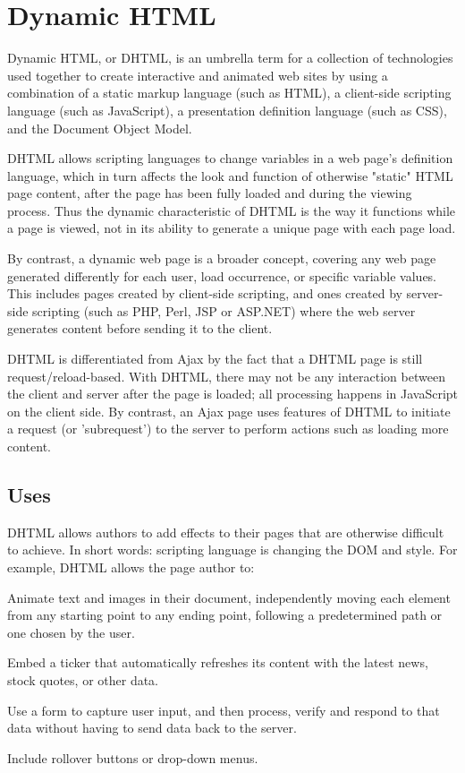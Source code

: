 \part{Dynamic HTML}


Dynamic HTML, or DHTML, is an umbrella term for a collection of technologies used together to create interactive and animated web sites by using a combination of a static markup language (such as HTML), a client-side scripting language (such as JavaScript), a presentation definition language (such as CSS), and the Document Object Model.

DHTML allows scripting languages to change variables in a web page's definition language, which in turn affects the look and function of otherwise "static" HTML page content, after the page has been fully loaded and during the viewing process. Thus the dynamic characteristic of DHTML is the way it functions while a page is viewed, not in its ability to generate a unique page with each page load.

By contrast, a dynamic web page is a broader concept, covering any web page generated differently for each user, load occurrence, or specific variable values. This includes pages created by client-side scripting, and ones created by server-side scripting (such as PHP, Perl, JSP or ASP.NET) where the web server generates content before sending it to the client.

DHTML is differentiated from Ajax by the fact that a DHTML page is still request/reload-based. With DHTML, there may not be any interaction between the client and server after the page is loaded; all processing happens in JavaScript on the client side. By contrast, an Ajax page uses features of DHTML to initiate a request (or 'subrequest') to the server to perform actions such as loading more content.



\chapter{Uses}


DHTML allows authors to add effects to their pages that are otherwise difficult to achieve. In short words: scripting language is changing the DOM and style. For example, DHTML allows the page author to:


\begin{compactitem}
\item Animate text and images in their document, independently moving each element from any starting point to any ending point, following a predetermined path or one chosen by the user.

\item Embed a ticker that automatically refreshes its content with the latest news, stock quotes, or other data.

\item Use a form to capture user input, and then process, verify and respond to that data without having to send data back to the server.

\item Include rollover buttons or drop-down menus.

\end{compactitem}


